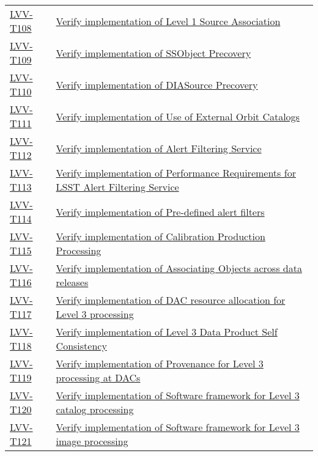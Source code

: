 \begin{longtable}[]{p{3cm}p{13cm}}
    \hyperref[lvv-t108]{LVV-T108} &
    \href{https://jira.lsstcorp.org/secure/Tests.jspa\#/testCase/LVV-T108}{Verify implementation of Level 1 Source Association} \tabularnewline
    \hyperref[lvv-t109]{LVV-T109} &
    \href{https://jira.lsstcorp.org/secure/Tests.jspa\#/testCase/LVV-T109}{Verify implementation of SSObject Precovery} \tabularnewline
    \hyperref[lvv-t110]{LVV-T110} &
    \href{https://jira.lsstcorp.org/secure/Tests.jspa\#/testCase/LVV-T110}{Verify implementation of DIASource Precovery} \tabularnewline
    \hyperref[lvv-t111]{LVV-T111} &
    \href{https://jira.lsstcorp.org/secure/Tests.jspa\#/testCase/LVV-T111}{Verify implementation of Use of External Orbit Catalogs} \tabularnewline
    \hyperref[lvv-t112]{LVV-T112} &
    \href{https://jira.lsstcorp.org/secure/Tests.jspa\#/testCase/LVV-T112}{Verify implementation of Alert Filtering Service} \tabularnewline
    \hyperref[lvv-t113]{LVV-T113} &
    \href{https://jira.lsstcorp.org/secure/Tests.jspa\#/testCase/LVV-T113}{Verify implementation of Performance Requirements for LSST Alert Filtering Service} \tabularnewline
    \hyperref[lvv-t114]{LVV-T114} &
    \href{https://jira.lsstcorp.org/secure/Tests.jspa\#/testCase/LVV-T114}{Verify implementation of Pre-defined alert filters} \tabularnewline
    \hyperref[lvv-t115]{LVV-T115} &
    \href{https://jira.lsstcorp.org/secure/Tests.jspa\#/testCase/LVV-T115}{Verify implementation of Calibration Production Processing} \tabularnewline
    \hyperref[lvv-t116]{LVV-T116} &
    \href{https://jira.lsstcorp.org/secure/Tests.jspa\#/testCase/LVV-T116}{Verify implementation of Associating Objects across data releases} \tabularnewline
    \hyperref[lvv-t117]{LVV-T117} &
    \href{https://jira.lsstcorp.org/secure/Tests.jspa\#/testCase/LVV-T117}{Verify implementation of  DAC resource allocation for Level 3 processing} \tabularnewline
    \hyperref[lvv-t118]{LVV-T118} &
    \href{https://jira.lsstcorp.org/secure/Tests.jspa\#/testCase/LVV-T118}{Verify implementation of Level 3 Data Product Self Consistency} \tabularnewline
    \hyperref[lvv-t119]{LVV-T119} &
    \href{https://jira.lsstcorp.org/secure/Tests.jspa\#/testCase/LVV-T119}{Verify implementation of Provenance for Level 3 processing at DACs} \tabularnewline
    \hyperref[lvv-t120]{LVV-T120} &
    \href{https://jira.lsstcorp.org/secure/Tests.jspa\#/testCase/LVV-T120}{Verify implementation of Software framework for Level 3 catalog processing} \tabularnewline
    \hyperref[lvv-t121]{LVV-T121} &
    \href{https://jira.lsstcorp.org/secure/Tests.jspa\#/testCase/LVV-T121}{Verify implementation of Software framework for Level 3 image processing} \tabularnewline

\end{longtable}
